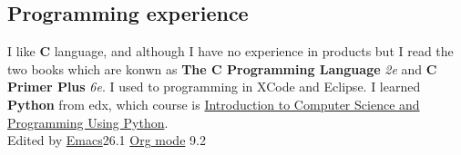 \documentclass[11pt]{article}
\begin{document}
\subsection*{Programming experience}
\label{sec:org01b8281}
I like \textbf{C} language, and although I have no experience in products but I read the two books which are konwn as
 \textbf{The C Programming Language} \emph{2e} and
\textbf{C Primer Plus} \emph{6e}. I used to programming in XCode and Eclipse.
I learned \textbf{Python} from edx, which course is
 \href{https://www.edx.org/course/introduction-to-computer-science-and-programming-using-python-0}{Introduction to Computer Science and Programming Using Python}.\\
 \vfill
Edited by \href{https://www.gnu.org/software/emacs/}{Emacs}26.1 \href{https://orgmode.org}{Org  mode} 9.2
\end{document}
